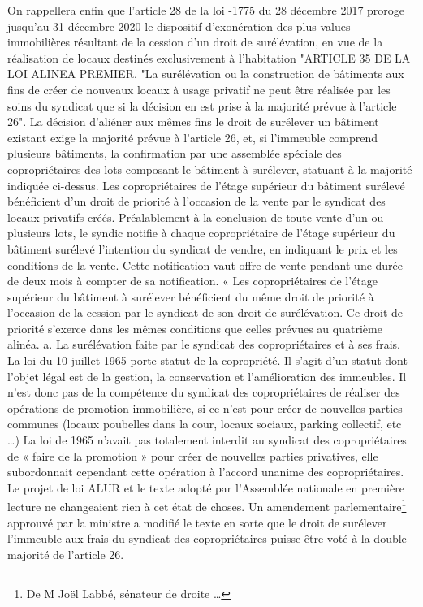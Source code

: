 	On rappellera enfin que l'article 28 de la loi -1775 du 28 décembre 2017 proroge jusqu'au 31 décembre 2020 le dispositif d'exonération des plus-values immobilières résultant de la cession d'un droit de surélévation, en vue de la réalisation de locaux destinés exclusivement à l'habitation
	"ARTICLE 35 DE LA LOI ALINEA PREMIER.
	"La surélévation ou la construction de bâtiments aux fins de créer de nouveaux locaux à usage privatif ne peut être réalisée par les soins du syndicat que si la décision en est prise à la majorité prévue à l’article 26". La décision d’aliéner aux mêmes fins le droit de surélever un bâtiment existant exige la majorité prévue à l’article 26, et, si l’immeuble comprend plusieurs bâtiments, la confirmation par une assemblée spéciale des copropriétaires des lots composant le bâtiment à surélever, statuant à la majorité indiquée ci-dessus.
	Les copropriétaires de l'étage supérieur du bâtiment surélevé bénéficient d'un droit de priorité à l'occasion de la vente par le syndicat des locaux privatifs créés. Préalablement à la conclusion de toute vente d'un ou plusieurs lots, le syndic notifie à chaque copropriétaire de l'étage supérieur du bâtiment surélevé l'intention du syndicat de vendre, en indiquant le prix et les conditions de la vente. Cette notification vaut offre de vente pendant une durée de deux mois à compter de sa notification.
	« Les copropriétaires de l'étage supérieur du bâtiment à surélever bénéficient du même droit de priorité à l'occasion de la cession par le syndicat de son droit de surélévation. Ce droit de priorité s'exerce dans les mêmes conditions que celles prévues au quatrième alinéa.
	a. La surélévation faite par le syndicat des copropriétaires et à ses frais.
	La loi du 10 juillet 1965 porte statut de la copropriété. Il s’agit d’un statut dont l’objet légal est de la gestion, la conservation et l’amélioration des immeubles.
	Il n’est donc pas de la compétence du syndicat des copropriétaires de réaliser des opérations de promotion immobilière, si ce n’est pour créer de nouvelles parties communes (locaux poubelles dans la cour, locaux sociaux, parking collectif, etc …)
	La loi de 1965 n’avait pas totalement interdit au syndicat des copropriétaires de « faire de la promotion » pour créer de nouvelles parties privatives, elle subordonnait cependant cette opération à l’accord unanime des copropriétaires.
	Le projet de loi ALUR et le texte adopté par l’Assemblée nationale en première lecture ne changeaient rien à cet état de choses.
	Un amendement parlementaire\footnote{De M Joël Labbé, sénateur de droite …} approuvé par la ministre a modifié le texte en sorte que le droit de surélever l’immeuble aux frais du syndicat des copropriétaires puisse être voté à la double majorité de l’article 26.

